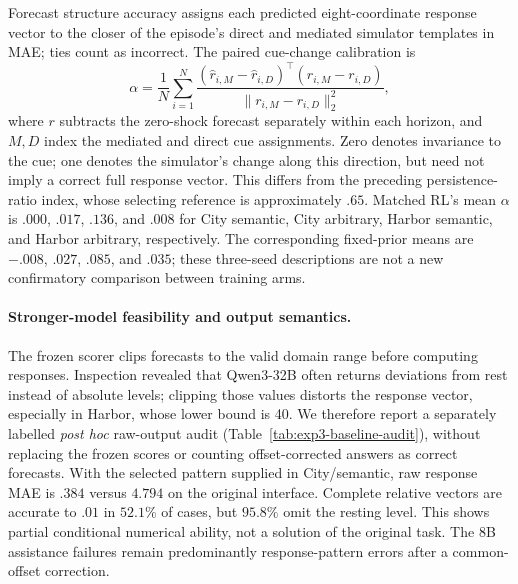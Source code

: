 \begin{table}[htbp]
\centering\small

\caption{\textbf{Reference naming succeeds while forecasting remains difficult.}
Name is selection-only accuracy; Original, Both, and Selected are response MAE
for the three forecast interfaces. Trained rows average all three seeds, not
selected endpoints. Each checkpoint contributes 24 paired episodes per cell.
Domain scales differ, so compare interfaces within a domain.}
\label{tab:exp3-components}
\end{table}

Forecast structure accuracy assigns each predicted eight-coordinate response
vector to the closer of the episode's direct and mediated simulator templates
in MAE; ties count as incorrect. The paired cue-change calibration is
\[
\alpha=\frac{1}{N}\sum_{i=1}^N
\frac{(\widehat r_{i,M}-\widehat r_{i,D})^\top(r_{i,M}-r_{i,D})}
     {\lVert r_{i,M}-r_{i,D}\rVert_2^2},
\]
where $r$ subtracts the zero-shock forecast separately within each horizon,
and $M,D$ index the mediated and direct cue assignments. Zero denotes
invariance to the cue; one denotes the simulator's change along this direction,
but need not imply a correct full response vector. This differs from the
preceding persistence-ratio index, whose selecting reference is approximately
$.65$. Matched RL's mean $\alpha$ is $.000$, $.017$, $.136$, and $.008$ for
City semantic, City arbitrary, Harbor semantic, and Harbor arbitrary,
respectively. The corresponding fixed-prior means are $-.008$, $.027$,
$.085$, and $.035$; these three-seed descriptions are not a new confirmatory
comparison between training arms.

\paragraph{Stronger-model feasibility and output semantics.}
The frozen scorer clips forecasts to the valid domain range before computing
responses. Inspection revealed that Qwen3-32B often returns deviations from rest
instead of absolute levels; clipping those values distorts the response vector,
especially in Harbor, whose lower bound is 40. We therefore report a separately
labelled \emph{post hoc} raw-output audit (Table~\ref{tab:exp3-baseline-audit}),
without replacing the frozen scores or counting offset-corrected answers as
correct forecasts. With the selected pattern supplied in City/semantic, raw
response MAE is $.384$ versus $4.794$ on the original interface. Complete
relative vectors are accurate to $.01$ in $52.1\%$ of cases, but $95.8\%$ omit
the resting level. This shows partial conditional numerical ability, not a
solution of the original task. The 8B assistance failures remain predominantly
response-pattern errors after a common-offset correction.


